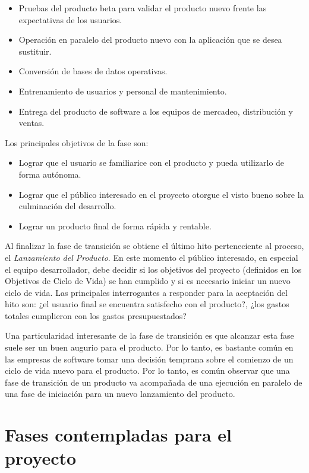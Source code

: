 \begin{itemize}
    \item Pruebas del producto beta para validar el producto nuevo frente las expectativas de los usuarios.
    \item Operación en paralelo del producto nuevo con la aplicación que se desea sustituir.
    \item Conversión de bases de datos operativas.
    \item Entrenamiento de usuarios y personal de mantenimiento.
    \item Entrega del producto de software a los equipos de mercadeo, distribución y ventas.
\end{itemize}

Los principales objetivos de la fase son:

\begin{itemize}
    \item Lograr que el usuario se familiarice con el producto y pueda utilizarlo de forma autónoma.
    \item Lograr que el público interesado en el proyecto otorgue el visto bueno sobre la culminación del desarrollo.
    \item Lograr un producto final de forma rápida y rentable.
\end{itemize}

Al finalizar la fase de transición se obtiene el último hito perteneciente al proceso, el \textit{Lanzamiento del Producto}. En este momento el público interesado, en especial el equipo desarrollador, debe decidir si los objetivos del proyecto (definidos en los Objetivos de Ciclo de Vida) se han cumplido y si es necesario iniciar un nuevo ciclo de vida. Las principales interrogantes a responder para la aceptación del hito son: ¿el usuario final se encuentra satisfecho con el producto?, ¿los gastos totales cumplieron con los gastos presupuestados?

Una particularidad interesante de la fase de transición es que alcanzar esta fase suele ser un buen augurio para el producto. Por lo tanto, es bastante común en las empresas de software tomar una decisión temprana sobre el comienzo de un ciclo de vida nuevo para el producto. Por lo tanto, es común observar que una fase de transición de un producto va acompañada de una ejecución en paralelo de una fase de iniciación para un nuevo lanzamiento del producto.

\section{Fases contempladas para el proyecto}
